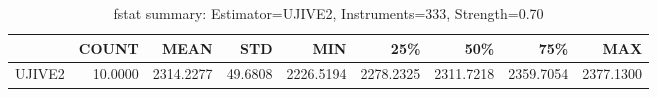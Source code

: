 \begin{table}[ht]
\centering
\caption{fstat summary: Estimator=UJIVE2, Instruments=333, Strength=0.70}
\begin{tabular}{lrrrrrrrr}
\toprule
 & COUNT & MEAN & STD & MIN & 25\% & 50\% & 75\% & MAX \\
\midrule
UJIVE2 & 10.0000 & 2314.2277 & 49.6808 & 2226.5194 & 2278.2325 & 2311.7218 & 2359.7054 & 2377.1300 \\
\bottomrule
\end{tabular}
\end{table}
